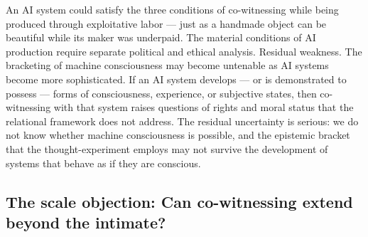 An AI system could satisfy the three conditions of co-witnessing while being produced through exploitative labor — just as a handmade object can be beautiful while its maker was underpaid. The material conditions of AI production require separate political and ethical analysis. Residual weakness. The bracketing of machine consciousness may become untenable as AI systems become more sophisticated. If an AI system develops — or is demonstrated to possess — forms of consciousness, experience, or subjective states, then co-witnessing with that system raises questions of rights and moral status that the relational framework does not address. The residual uncertainty is serious: we do not know whether machine consciousness is possible, and the epistemic bracket that the thought-experiment employs may not survive the development of systems that behave as if they are conscious.

\subsection{The scale objection: Can co-witnessing extend beyond the intimate?}

